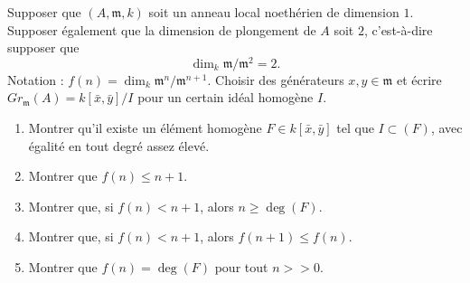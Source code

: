 \begin{exercise}
\label{exercise-embedding-2-dim-1}
Supposer que $(A, {\mathfrak m}, k)$ soit un anneau local noethérien de
dimension $1$. Supposer également que la dimension de plongement de $A$ soit
$2$, c'est-à-dire supposer que
$$
\dim_k {\mathfrak m}/{\mathfrak m}^2 = 2.
$$
Notation : $f(n) = \dim_k {\mathfrak m}^n/{\mathfrak m}^{n + 1}$.
Choisir des générateurs $x, y \in {\mathfrak m}$
et écrire $Gr_{\mathfrak m}(A) = k[\bar x, \bar y]/I$ pour un certain
idéal homogène $I$.
\begin{enumerate}
\item Montrer qu'il existe un élément homogène
$F\in k[\bar x, \bar y]$ tel que $I \subset (F)$, avec égalité
en tout degré assez élevé.
\item Montrer que $f(n) \leq n + 1$.
\item Montrer que, si $f(n) < n + 1$, alors $n \geq \deg(F)$.
\item Montrer que, si $f(n) < n + 1$, alors $f(n + 1) \leq f(n)$.
\item Montrer que $f(n) = \deg(F)$ pour tout $n >> 0$.
\end{enumerate}
\end{exercise}


